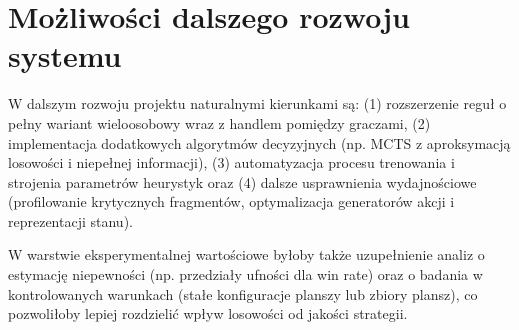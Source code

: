 \documentclass[polish,inz,longabstract]{iithesis}
\begin{document}
\section{Możliwości dalszego rozwoju systemu}
W dalszym rozwoju projektu naturalnymi kierunkami są: (1) rozszerzenie reguł o pełny wariant wieloosobowy wraz z handlem pomiędzy graczami, (2) implementacja dodatkowych algorytmów decyzyjnych (np. MCTS z aproksymacją losowości i niepełnej informacji), (3) automatyzacja procesu trenowania i strojenia parametrów heurystyk oraz (4) dalsze usprawnienia wydajnościowe (profilowanie krytycznych fragmentów, optymalizacja generatorów akcji i reprezentacji stanu).

W warstwie eksperymentalnej wartościowe byłoby także uzupełnienie analiz o estymację niepewności (np. przedziały ufności dla win rate) oraz o badania w kontrolowanych warunkach (stałe konfiguracje planszy lub zbiory plansz), co pozwoliłoby lepiej rozdzielić wpływ losowości od jakości strategii.
\end{document}
